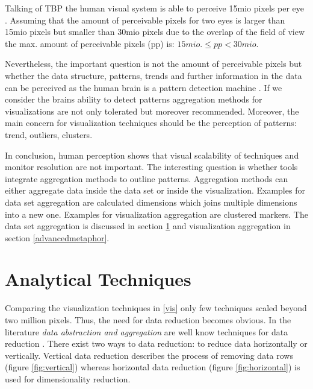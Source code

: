 Talking of TBP  the human visual system is able to perceive 15mio pixels per eye  \cite{Deering1998}. Assuming that the amount of perceivable pixels for two eyes is larger than 15mio pixels but smaller than 30mio pixels due to the overlap of the field of view the max. amount of perceivable pixels (pp) is:
\begin{math}
15 mio. \leq pp < 30 mio.
\end{math}

Nevertheless, the important question is not the amount of perceivable pixels but whether the data structure, patterns, trends and further information in the data can be perceived as the human brain is a pattern detection machine  \cite{Ware2012a}. If we consider the brains ability to detect patterns aggregation methods for visualizations are not only tolerated but moreover recommended. Moreover, the main concern for visualization techniques should be the perception of patterns: trend, outliers, clusters. 
\par
In conclusion, human perception shows that visual scalability of techniques and monitor resolution are not important. The interesting question is whether tools integrate aggregation methods to outline patterns. \label{pattern}
Aggregation methods can either aggregate data inside the data set or inside the visualization. Examples for data set aggregation are calculated dimensions which joins multiple dimensions into a new one. Examples for visualization aggregation are clustered markers. The data set aggregation is discussed in section \ref{analytical} and visualization aggregation in section \ref{advancedmetaphor}.

\section{Analytical Techniques}\label{analytical}
Comparing the visualization techniques in \ref{vis} only few techniques scaled beyond two million pixels. Thus, the need for data reduction becomes obvious. In the literature \textit{data abstraction and aggregation} are well know techniques for data reduction  \cite{FerreiradeOliveira2003,Aigner2011, Keim2005}. There exist two ways to data reduction: to reduce data horizontally or vertically. 
Vertical data reduction describes the process of removing data rows (figure \ref{fig:vertical}) whereas horizontal data reduction (figure \ref{fig:horizontal}) is used for dimensionality reduction.


